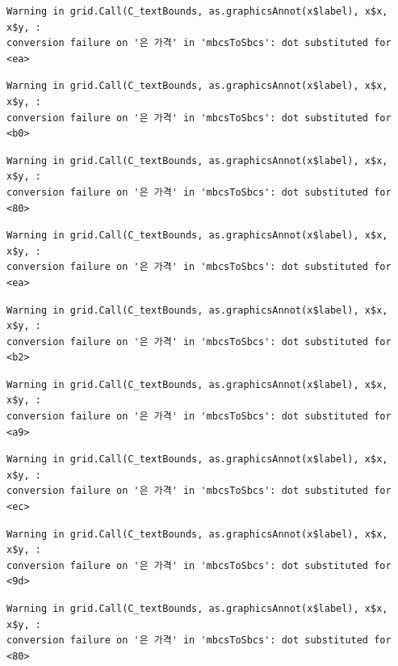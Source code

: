 \documentclass[
  letterpaper,
  DIV=11,
  numbers=noendperiod]{scrreprt}
\begin{document}
\begin{verbatim}
Warning in grid.Call(C_textBounds, as.graphicsAnnot(x$label), x$x, x$y, :
conversion failure on '은 가격' in 'mbcsToSbcs': dot substituted for <ea>
\end{verbatim}

\begin{verbatim}
Warning in grid.Call(C_textBounds, as.graphicsAnnot(x$label), x$x, x$y, :
conversion failure on '은 가격' in 'mbcsToSbcs': dot substituted for <b0>
\end{verbatim}

\begin{verbatim}
Warning in grid.Call(C_textBounds, as.graphicsAnnot(x$label), x$x, x$y, :
conversion failure on '은 가격' in 'mbcsToSbcs': dot substituted for <80>
\end{verbatim}

\begin{verbatim}
Warning in grid.Call(C_textBounds, as.graphicsAnnot(x$label), x$x, x$y, :
conversion failure on '은 가격' in 'mbcsToSbcs': dot substituted for <ea>
\end{verbatim}

\begin{verbatim}
Warning in grid.Call(C_textBounds, as.graphicsAnnot(x$label), x$x, x$y, :
conversion failure on '은 가격' in 'mbcsToSbcs': dot substituted for <b2>
\end{verbatim}

\begin{verbatim}
Warning in grid.Call(C_textBounds, as.graphicsAnnot(x$label), x$x, x$y, :
conversion failure on '은 가격' in 'mbcsToSbcs': dot substituted for <a9>
\end{verbatim}

\begin{verbatim}
Warning in grid.Call(C_textBounds, as.graphicsAnnot(x$label), x$x, x$y, :
conversion failure on '은 가격' in 'mbcsToSbcs': dot substituted for <ec>
\end{verbatim}

\begin{verbatim}
Warning in grid.Call(C_textBounds, as.graphicsAnnot(x$label), x$x, x$y, :
conversion failure on '은 가격' in 'mbcsToSbcs': dot substituted for <9d>
\end{verbatim}

\begin{verbatim}
Warning in grid.Call(C_textBounds, as.graphicsAnnot(x$label), x$x, x$y, :
conversion failure on '은 가격' in 'mbcsToSbcs': dot substituted for <80>
\end{verbatim}
\end{document}
